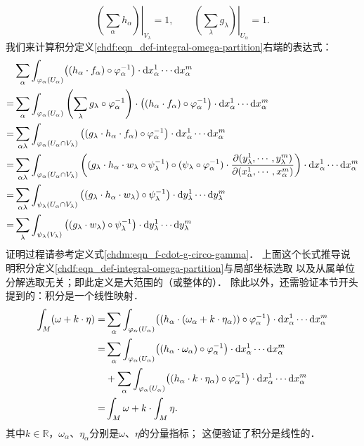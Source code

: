 \begin{equation}
    \left. \left(\sum_{\alpha}h_\alpha\right) \right|_{V_\lambda} = 1, \qquad
    \left. \left(\sum_{\lambda}g_\lambda\right) \right|_{U_\alpha} = 1 .
\end{equation}
我们来计算积分定义\eqref{chdf:eqn_def-integral-omega-partition}右端的表达式：
\begin{align*}
    &\sum_{\alpha}\int_{\varphi_\alpha(U_\alpha)}   \bigl( (h_\alpha \cdot f_\alpha )
    \circ\varphi^{-1}_\alpha\bigr)\cdot  {\rm d}x^1_\alpha \cdots {\rm d}x^m_\alpha \\
    =&\sum_{\alpha}\int_{\varphi_\alpha(U_\alpha)}  \left(\sum_{\lambda}g_\lambda \circ
    \varphi^{-1}_\alpha \right) \cdot
    \bigl( (h_\alpha \cdot f_\alpha )\circ \varphi^{-1}_\alpha\bigr)
    \cdot {\rm d}x^1_\alpha \cdots {\rm d}x^m_\alpha  \\
    =&\sum_{\alpha\lambda} \int_{\varphi_\alpha(U_\alpha\cap V_\lambda)}  \left( (g_\lambda \cdot
       h_\alpha \cdot f_\alpha ) \circ \varphi^{-1}_\alpha \right) \cdot
    {\rm d}x^1_\alpha \cdots {\rm d}x^m_\alpha \\
    =&\sum_{\alpha\lambda} \int_{\varphi_\alpha(U_\alpha\cap V_\lambda)}  \left( (g_\lambda \cdot
    h_\alpha \cdot  w_\lambda \circ \psi^{-1}_\lambda )
    \circ (\psi_\lambda \circ \varphi^{-1}_\alpha)
    \cdot\frac{\partial (y^1_\lambda,\cdots, y^m_\lambda)}
    {\partial (x^1_\alpha, \cdots, x^m_\alpha)}  \right) \cdot
    {\rm d}x^1_\alpha \cdots {\rm d}x^m_\alpha \\
    =&\sum_{\alpha\lambda} \int_{\psi_\lambda(U_\alpha\cap V_\lambda)}
    \left( (g_\lambda \cdot
    h_\alpha \cdot w_\lambda) \circ \psi^{-1}_\lambda
     \right) \cdot  {\rm d}y^1_\lambda \cdots {\rm d}y^m_\lambda \\
   =&\sum_{\lambda} \int_{\psi_\lambda(V_\lambda)}  \left( (g_\lambda
     \cdot w_\lambda ) \circ \psi^{-1}_\lambda \right)
     \cdot  {\rm d}y^1_\lambda \cdots {\rm d}y^m_\lambda
\end{align*}
证明过程请参考定义式\eqref{chdm:eqn_f-cdot-g-circo-gamma}．
上面这个长式推导说明积分定义\ref{chdf:eqn_def-integral-omega-partition}与局部坐标选取
以及从属单位分解选取无关；即此定义是大范围的（或整体的）．
除此以外，还需验证本节开头提到的：积分是一个线性映射．
\begin{align*}
    \int_{M} (\omega + k\cdot \eta ) =&
    \sum_{\alpha}\int_{\varphi_\alpha(U_\alpha)}  \bigl( (h_\alpha \cdot (\omega_\alpha+k\cdot \eta_\alpha ) )
    \circ\varphi^{-1}_\alpha\bigr)\cdot  {\rm d}x^1_\alpha \cdots {\rm d}x^m_\alpha \\
    =&\sum_{\alpha}\int_{\varphi_\alpha(U_\alpha)}  \bigl( (h_\alpha \cdot \omega_\alpha )
    \circ\varphi^{-1}_\alpha\bigr)\cdot  {\rm d}x^1_\alpha \cdots {\rm d}x^m_\alpha \\
     &+\sum_{\alpha}\int_{\varphi_\alpha(U_\alpha)}  \bigl( (h_\alpha \cdot k\cdot\eta_\alpha )
    \circ\varphi^{-1}_\alpha\bigr)\cdot  {\rm d}x^1_\alpha \cdots {\rm d}x^m_\alpha \\
    =&\int_{M} \omega  +k\cdot \int_{M} \eta .
\end{align*} %
其中$k\in \mathbb{R}$，$\omega_\alpha$、$\eta_\alpha$分别是$\omega$、$\eta$的分量指标；
这便验证了积分是线性的．

